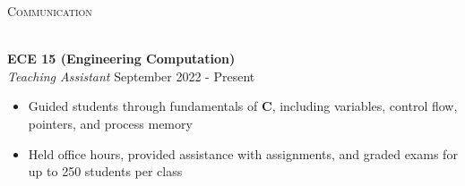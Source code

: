 \documentclass[a4paper]{article}
\newcommand{\lineunder} {
    \vspace*{-8pt} \\
    \hspace*{-18pt} \hrulefill \\
}
\newcommand{\header} [1] {
    {\hspace*{-18pt}\vspace*{6pt} \textsc{#1}}
    \vspace*{-6pt} \lineunder
}
\newenvironment{entry}[4][]{
  \textbf{#2} \hfill #1 \\
  \textit{#3} \hfill #4 \\
  \vspace{-2mm}
  \begin{itemize} \itemsep 0em
  }
  {
  \end{itemize}
}
\begin{document}
\begin{comment}
\begin{entry}{Infantry Firmware - Robomaster}{Firmware, Circuit Design}{January 2019 - August 2019}
\item Implemented control firmware on \textbf{STM32} chip for a 2-DOF turret mounted on a 4-wheel robot
\item Angle control of motors achieved using sensor data from encoders and IMU
  over \textbf{UART} and \textbf{I2C} with \textbf{PID}
\item Designed and soldered power circuit with supercaps in parallel with
  battery to circumvent power restrictions
\end{entry}
\end{comment}
\begin{comment}
\begin{entry}{Pinball Machine}{Rapid Prototyping, Computer Aided Design, Circuit
    Design}{April 2022 - June 2022}
\item Designed and built pinball machine, including subsystems for flipper and bumper mechanism
\item Modeled all components in \textbf{Solidworks}, manufactured primarily with \textbf{3D printing} and \textbf{laser cutting}
\item Designed circuitry to control flippers on button press, and bumpers that
  trigger (via piezoelectric) when hit
\item Wrote software to run on an Arduino to control all actuators and keep
  track of game state
\end{entry}


\end{entry}
\end{comment}




\header{Communication}
\vspace{1mm}

\begin{entry}{ECE 15 (Engineering Computation)}{Teaching Assistant}{September 2022 - Present}
  \item Guided students through fundamentals of \textbf{C},
    including variables, control flow, pointers, and process memory 
  \item Held office hours, provided assistance with assignments, and graded exams for up to 250 students per class
\end{entry}
\end{document}
